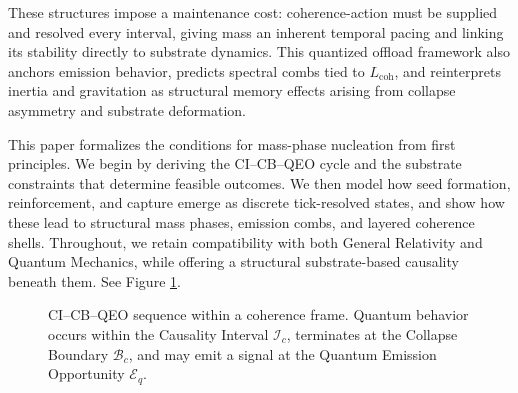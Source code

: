 \documentclass[preprints,article,submit,pdftex,moreauthors]{Definitions/mdpi}
\begin{document}
These structures impose a maintenance cost: coherence-action must be supplied and resolved every interval, giving mass an inherent temporal pacing and linking its stability directly to substrate dynamics. This quantized offload framework also anchors emission behavior, predicts spectral combs tied to \( L_{\mathrm{coh}} \), and reinterprets inertia and gravitation as structural memory effects arising from collapse asymmetry and substrate deformation.

This paper formalizes the conditions for mass-phase nucleation from first principles. We begin by deriving the CI–CB–QEO cycle and the substrate constraints that determine feasible outcomes. We then model how seed formation, reinforcement, and capture emerge as discrete tick-resolved states, and show how these lead to structural mass phases, emission combs, and layered coherence shells. Throughout, we retain compatibility with both General Relativity and Quantum Mechanics, while offering a structural substrate-based causality beneath them. See Figure \ref{fig:cicbqeo}.

\begin{figure}[h!]
\centering
{}
\caption{CI–CB–QEO sequence within a coherence frame. Quantum behavior occurs within the Causality Interval \( \mathcal{I}_c \), terminates at the Collapse Boundary \( \mathcal{B}_c \), and may emit a signal at the Quantum Emission Opportunity \( \mathcal{E}_q \).}
\label{fig:cicbqeo}
\end{figure}
\end{document}
